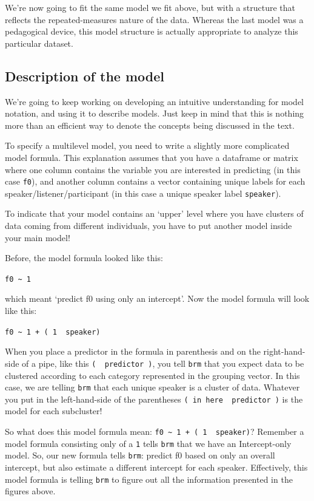 \documentclass[
]{book}
\begin{document}
We're now going to fit the same model we fit above, but with a structure that reflects the repeated-measures nature of the data. Whereas the last model was a pedagogical device, this model structure is actually appropriate to analyze this particular dataset.

\hypertarget{description-of-the-model-1}{%
\subsection{Description of the model}\label{description-of-the-model-1}}

We're going to keep working on developing an intuitive understanding for model notation, and using it to describe models. Just keep in mind that this is nothing more than an efficient way to denote the concepts being discussed in the text.

To specify a multilevel model, you need to write a slightly more complicated model formula. This explanation assumes that you have a dataframe or matrix where one column contains the variable you are interested in predicting (in this case \texttt{f0}), and another column contains a vector containing unique labels for each speaker/listener/participant (in this case a unique speaker label \texttt{speaker}).

To indicate that your model contains an `upper' level where you have clusters of data coming from different individuals, you have to put another model inside your main model!

Before, the model formula looked like this:

\texttt{f0\ \textasciitilde{}\ 1}

which meant `predict f0 using only an intercept'. Now the model formula will look like this:

\texttt{f0\ \textasciitilde{}\ 1\ +\ (\ 1\ \textbar{}\ speaker)}

When you place a predictor in the formula in parenthesis and on the right-hand-side of a pipe, like this \texttt{(\ \textbar{}\ predictor\ )}, you tell \texttt{brm} that you expect data to be clustered according to each category represented in the grouping vector. In this case, we are telling \texttt{brm} that each unique speaker is a cluster of data. Whatever you put in the left-hand-side of the parentheses \texttt{(\ in\ here\ \textbar{}\ predictor\ )} is the model for each subcluster!

So what does this model formula mean: \texttt{f0\ \textasciitilde{}\ 1\ +\ (\ 1\ \textbar{}\ speaker)}? Remember a model formula consisting only of a \texttt{1} tells \texttt{brm} that we have an Intercept-only model. So, our new formula tells \texttt{brm}: predict f0 based on only an overall intercept, but also estimate a different intercept for each speaker. Effectively, this model formula is telling \texttt{brm} to figure out all the information presented in the figures above.
\end{document}
